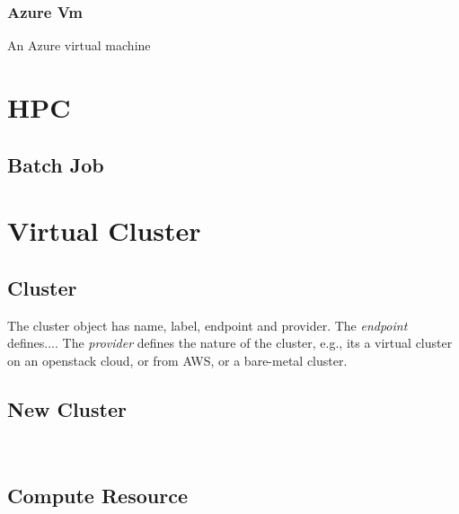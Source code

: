 \documentclass[9pt,twocolumn,twoside]{styles/osajnl}
\begin{document}

\subsubsection{Azure Vm}

An Azure virtual machine



\section{HPC}

\subsection{Batch Job}


\section{Virtual Cluster}

\subsection{Cluster}

The cluster object has name, label, endpoint and provider. The
\textit{endpoint} defines....  The \textit{provider} defines the
nature of the cluster, e.g., its a virtual cluster on an openstack
cloud, or from AWS, or a bare-metal cluster.



\subsection{New Cluster}

\
\subsection{Compute Resource}
\end{document}
